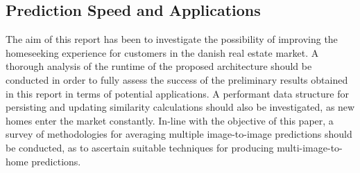 \subsection{Prediction Speed and Applications}
The aim of this report has been to investigate the possibility of improving the homeseeking experience for customers in the danish real estate market. 
A thorough analysis of the runtime of the proposed architecture should be conducted in order to fully assess the success of the preliminary results obtained in this report in terms of potential applications.
\newline
\newline
A performant data structure for persisting and updating similarity calculations should also be investigated, as new homes enter the market constantly. 
In-line with the objective of this paper, a survey of methodologies for averaging multiple image-to-image predictions should be conducted, as to ascertain suitable techniques for producing multi-image-to-home predictions.




